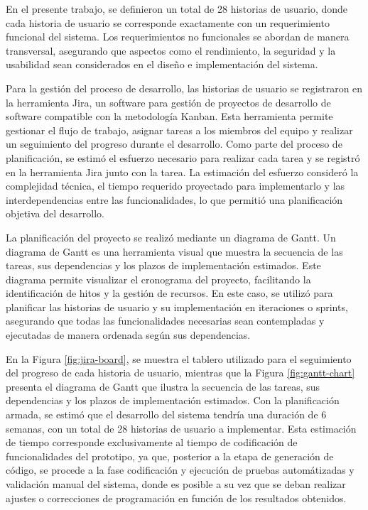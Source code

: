 En el presente trabajo, se definieron un total de 28 historias de usuario, donde cada historia de usuario se corresponde exactamente con un requerimiento funcional del sistema. Los requerimientos no funcionales se abordan de manera transversal, asegurando que aspectos como el rendimiento, la seguridad y la usabilidad sean considerados en el diseño e implementación del sistema.

Para la gestión del proceso de desarrollo, las historias de usuario se registraron en la herramienta Jira, un software para gestión de proyectos de desarrollo de software compatible con la metodología Kanban. Esta herramienta permite gestionar el flujo de trabajo, asignar tareas a los miembros del equipo y realizar un seguimiento del progreso durante el desarrollo. Como parte del proceso de planificación, se estimó el esfuerzo necesario para realizar cada tarea y se registró en la herramienta Jira junto con la tarea. La estimación del esfuerzo consideró la complejidad técnica, el tiempo requerido proyectado para implementarlo y las interdependencias entre las funcionalidades, lo que permitió una planificación objetiva del desarrollo.

La planificación del proyecto se realizó mediante un diagrama de Gantt. Un diagrama de Gantt es una herramienta visual que muestra la secuencia de las tareas, sus dependencias y los plazos de implementación estimados. Este diagrama permite visualizar el cronograma del proyecto, facilitando la identificación de hitos y la gestión de recursos. En este caso, se utilizó para planificar las historias de usuario y su implementación en iteraciones o sprints, asegurando que todas las funcionalidades necesarias sean contempladas y ejecutadas de manera ordenada según sus dependencias.

En la Figura \ref{fig:jira-board}, se muestra el tablero utilizado para el seguimiento del progreso de cada historia de usuario, mientras que la Figura \ref{fig:gantt-chart} presenta el diagrama de Gantt que ilustra la secuencia de las tareas, sus dependencias y los plazos de implementación estimados. Con la planificación armada, se estimó que el desarrollo del sistema tendría una duración de 6 semanas, con un total de 28 historias de usuario a implementar. Esta estimación de tiempo corresponde exclusivamente al tiempo de codificación de funcionalidades del prototipo, ya que, posterior a la etapa de generación de código, se procede a la fase codificación y ejecución de pruebas automátizadas y validación manual del sistema, donde es posible a su vez que se deban realizar ajustes o correcciones de programación en función de los resultados obtenidos.

